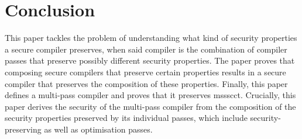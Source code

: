 \documentclass[dvipsnames,conference]{IEEEtran}
\theoremstyle{definition}
\begin{document}
\section{Conclusion}\label{sec:concl}
This paper tackles the problem of understanding what kind of security properties a secure compiler preserves, when said compiler is the combination of compiler passes that preserve possibly different security properties.
% 
% 
The paper proves that composing secure compilers that preserve certain properties results in a secure compiler that preserves the composition of these properties.
% 
Finally, this paper defines a multi-pass compiler and proves that it preserves \gls*{mssscct}.
Crucially, this paper derives the security of the multi-pass compiler from the composition of the security properties preserved by its individual passes, which include security-preserving as well as optimisation passes.






\end{document}
